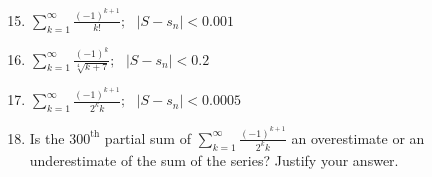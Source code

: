 \documentclass[12pt]{article}
\newif\ifans
\begin{document}

\begin{enumerate}
\setcounter{enumi}{14}

\item $\sum_{k=1}^{\infty}{\frac{(-1)^{k+1}}{k!}}; \text{         }|S-s_n|<0.001$

\ifans{\fbox{$n = 6$; Detailed Solution: \textcolor{blue}{\href{http://www.math.drexel.edu/classes/Calculus/resources/Math123HW/Solutions/123_10_Alternating_Series_15.pdf}{Here}}}} \fi

\item $\sum_{k=1}^{\infty}{\frac{(-1)^k}{\sqrt[4]{k+7}}}; \text{         }|S-s_n|<0.2$

\ifans{\fbox{$n = 617$}} \fi

\item $\sum_{k=1}^{\infty}{\frac{(-1)^{k+1}}{2^k k}}; \text{         }|S-s_n|<0.0005$

\ifans{\fbox{$n = 7$}} \fi

\item Is the $300^{\text {th}}$ partial sum of $\textstyle \sum_{k=1}^{\infty}{\frac{(-1)^{k+1}}{2^k k}}$ an overestimate or an underestimate of the sum of the series?  Justify your answer.

\ifans{\fbox{\parbox{1\linewidth}{Let $S$ be the sum of the series.  Now the first term of the series is positive, the second is negative, the third positive, the fourth negative, and so on.  
Thus the sequence of odd partial sums is decreasing (and converges to $S$) while the sequence of even partial sums is increasing (and converges to $S$).  So every odd partial sum is an
overestimate of $S$ and every even partial sum is an underestimate of $S$.  Therefore the $300^{\text {th}}$ partial sum of the series is an underestimate of $S$.       }}} \fi




\end{enumerate}
\end{document}
